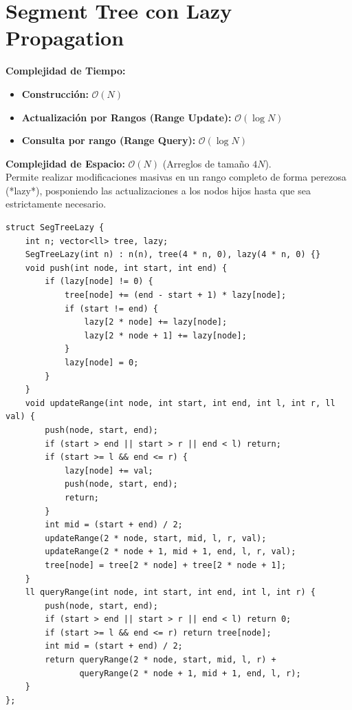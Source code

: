 \documentclass[10pt,twocolumn,letterpaper]{report}
\begin{document}
\section{Segment Tree con Lazy Propagation}
\textbf{Complejidad de Tiempo:}
\begin{itemize}
    \item \textbf{Construcción:} $\mathcal{O}(N)$
    \item \textbf{Actualización por Rangos (Range Update):} $\mathcal{O}(\log N)$
    \item \textbf{Consulta por rango (Range Query):} $\mathcal{O}(\log N)$
\end{itemize}
\textbf{Complejidad de Espacio:} $\mathcal{O}(N)$ (Arreglos de tamaño $4N$). \\
Permite realizar modificaciones masivas en un rango completo de forma perezosa (*lazy*), posponiendo las actualizaciones a los nodos hijos hasta que sea estrictamente necesario.
\begin{lstlisting}
struct SegTreeLazy {
    int n; vector<ll> tree, lazy;
    SegTreeLazy(int n) : n(n), tree(4 * n, 0), lazy(4 * n, 0) {}
    void push(int node, int start, int end) {
        if (lazy[node] != 0) {
            tree[node] += (end - start + 1) * lazy[node];
            if (start != end) {
                lazy[2 * node] += lazy[node];
                lazy[2 * node + 1] += lazy[node];
            }
            lazy[node] = 0;
        }
    }
    void updateRange(int node, int start, int end, int l, int r, ll val) {
        push(node, start, end);
        if (start > end || start > r || end < l) return;
        if (start >= l && end <= r) {
            lazy[node] += val;
            push(node, start, end);
            return;
        }
        int mid = (start + end) / 2;
        updateRange(2 * node, start, mid, l, r, val);
        updateRange(2 * node + 1, mid + 1, end, l, r, val);
        tree[node] = tree[2 * node] + tree[2 * node + 1];
    }
    ll queryRange(int node, int start, int end, int l, int r) {
        push(node, start, end);
        if (start > end || start > r || end < l) return 0;
        if (start >= l && end <= r) return tree[node];
        int mid = (start + end) / 2;
        return queryRange(2 * node, start, mid, l, r) + 
               queryRange(2 * node + 1, mid + 1, end, l, r);
    }
};
\end{lstlisting}
\end{document}

